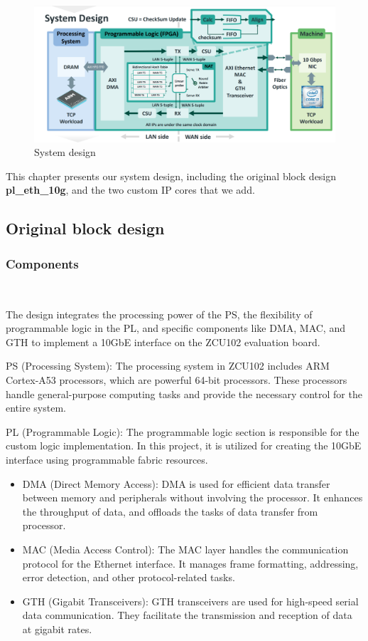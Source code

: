 \begin{figure}[h]
    \centering
    \includegraphics[width=\linewidth]{images/design.png}
    \caption{System design}
\end{figure}
    This chapter presents our system design, including the original block design \textbf{pl\_eth\_10g}, and the two custom IP cores that we add. 

\subsection{Original block design}

    \subsubsection{Components}\

    The design integrates the processing power of the PS, the flexibility of programmable logic in the PL, and specific components like DMA, MAC, and GTH to implement a 10GbE interface on the ZCU102 evaluation board.

    PS (Processing System): The processing system in ZCU102 includes ARM Cortex-A53 processors, which are powerful 64-bit processors. These processors handle general-purpose computing tasks and provide the necessary control for the entire system.
    
    PL (Programmable Logic): The programmable logic section is responsible for the custom logic implementation. In this project, it is utilized for creating the 10GbE interface using programmable fabric resources.

    \begin{itemize}
    \item {DMA (Direct Memory Access)}: DMA is used for efficient data transfer between memory and peripherals without involving the processor. It enhances the throughput of data, and offloads the tasks of data transfer from processor.
    \item {MAC (Media Access Control)}: The MAC layer handles the communication protocol for the Ethernet interface. It manages frame formatting, addressing, error detection, and other protocol-related tasks.
    \item {GTH (Gigabit Transceivers)}: GTH transceivers are used for high-speed serial data communication. They facilitate the transmission and reception of data at gigabit rates.
    \end{itemize}

